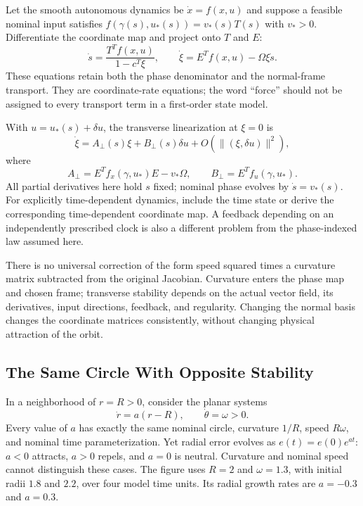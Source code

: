 \documentclass[12pt, openany]{book}
\theoremstyle{plain}
\begin{document}
Let the smooth autonomous dynamics be $\dot x=f(x,u)$ and suppose a feasible
nominal input satisfies
$f(\gamma(s),u_*(s))=v_*(s)T(s)$ with $v_*>0$. Differentiate the coordinate
map and project onto $T$ and $E$:
\begin{equation}\label{eq:curve_exact_transverse}
 \dot s=\frac{T^Tf(x,u)}{1-c^T\xi},\qquad
 \dot\xi=E^Tf(x,u)-\Omega\xi\dot s.
\end{equation}
These equations retain both the phase denominator and the normal-frame
transport. They are coordinate-rate equations; the word ``force'' should
not be assigned to every transport term in a first-order state model.

With $u=u_*(s)+\delta u$, the transverse linearization at $\xi=0$ is
\begin{equation}\label{eq:transverse_lin}
 \dot\xi=A_\perp(s)\xi+B_\perp(s)\delta u
 +O(\|(\xi,\delta u)\|^2),
\end{equation}
where
\begin{equation}
 A_\perp=E^Tf_x(\gamma,u_*)E-v_*\Omega,
 \qquad B_\perp=E^Tf_u(\gamma,u_*).
\end{equation}
All partial derivatives here hold $s$ fixed; nominal phase evolves by
$\dot s=v_*(s)$. For explicitly time-dependent dynamics, include the time
state or derive the corresponding time-dependent coordinate map. A
feedback depending on an independently prescribed clock is also a different
problem from the phase-indexed law assumed here.

There is no universal correction of the form speed squared times a curvature
matrix subtracted from the original Jacobian. Curvature enters the phase
map and chosen frame; transverse stability depends on the actual vector
field, its derivatives, input directions, feedback, and regularity.
Changing the normal basis changes the coordinate matrices consistently,
without changing physical attraction of the orbit.

\subsection{The Same Circle With Opposite Stability}

In a neighborhood of $r=R>0$, consider the planar systems
\begin{equation}
 \dot r=a(r-R),\qquad \dot\theta=\omega>0.
\end{equation}
Every value of $a$ has exactly the same nominal circle, curvature $1/R$,
speed $R\omega$, and nominal time parameterization. Yet radial error evolves
as $e(t)=e(0)e^{at}$: $a<0$ attracts, $a>0$ repels, and $a=0$ is neutral.
Curvature and nominal speed cannot distinguish these cases. The figure uses
$R=2$ and $\omega=1.3$, with initial radii $1.8$ and $2.2$, over four model
time units. Its radial growth rates are $a=-0.3$ and $a=0.3$.
\end{document}
